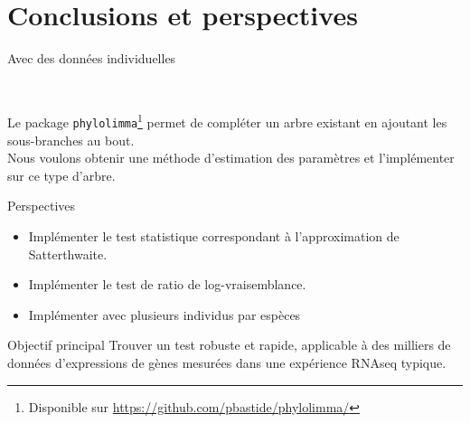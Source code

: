 \documentclass[10pt]{beamer}\usepackage[]{graphicx}\usepackage[]{xcolor}
\begin{document}
\section{Conclusions et perspectives}
\begin{frame}{Avec des données individuelles}
\begin{center}
\usetikzlibrary{trees}
\\
\end{center}
Le package \texttt{phylolimma}\footnote{Disponible sur \url{https://github.com/pbastide/phylolimma/}} permet de compléter un arbre existant en ajoutant les sous-branches au bout.\\
Nous voulons obtenir une méthode d'estimation des paramètres et l'implémenter sur ce type d'arbre.
\end{frame}
\begin{frame}{Perspectives}
    \begin{itemize}
        \item Implémenter le test statistique correspondant à l'approximation de Satterthwaite.
        \item Implémenter le test de ratio de log-vraisemblance.
        \item Implémenter avec plusieurs individus par espèces
    \end{itemize}
    \begin{block}{Objectif principal}
    Trouver un test robuste et rapide, applicable à des milliers de données d'expressions de gènes mesurées dans une expérience RNAseq typique.
    \end{block}

\end{frame}
\end{document}

